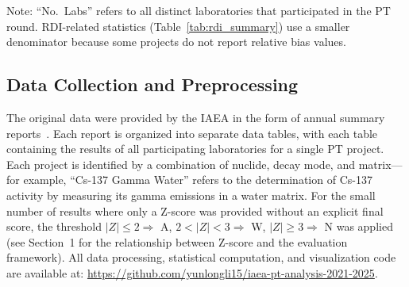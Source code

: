 \documentclass[12pt,a4paper,twoside]{article}
\begin{document}
\begin{table}[H]
\centering
\caption{Overview of IAEA TERC proficiency test rounds analyzed in this study.}
\label{tab:yearly_overview}
\par\vspace{4pt}\footnotesize Note: ``No.\ Labs'' refers to all distinct laboratories that participated in the PT round. RDI-related statistics (Table~\ref{tab:rdi_summary}) use a smaller denominator because some projects do not report relative bias values.
\end{table}


\subsection{Data Collection and Preprocessing}
The original data were provided by the IAEA in the form of annual summary reports~\cite{iaea2021report,iaea2022report,iaea2023report,iaea2024report,iaea2025report}. Each report is organized into separate data tables, with each table containing the results of all participating laboratories for a single PT project. Each project is identified by a combination of nuclide, decay mode, and matrix---for example, ``Cs-137 Gamma Water'' refers to the determination of Cs-137 activity by measuring its gamma emissions in a water matrix. For the small number of results where only a Z-score was provided without an explicit final score, the threshold $|Z| \leq 2 \Rightarrow$ A, $2 < |Z| < 3 \Rightarrow$ W, $|Z| \geq 3 \Rightarrow$ N was applied (see Section~1 for the relationship between Z-score and the evaluation framework). All data processing, statistical computation, and visualization code are available at: \href{https://github.com/yunlongli15/iaea-pt-analysis-2021-2025}{https://github.com/yunlongli15/iaea-pt-analysis-2021-2025}.
\end{document}

